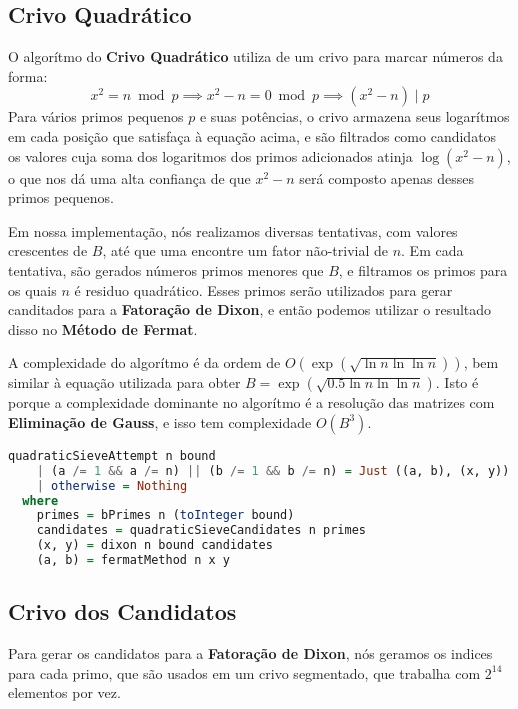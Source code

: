 \documentclass{article}
\newcommand{\divides}{\mid}
\begin{document}
\subsection{Crivo Quadrático}
\label{quadraticSieve}
O algorítmo do \textbf{Crivo Quadrático} utiliza de um crivo para marcar números da forma:
$$ x^2 = n \bmod p \implies x^2 - n = 0 \bmod p \implies (x^2 - n) \divides p $$
Para vários primos pequenos $p$ e suas potências, o crivo armazena seus logarítmos em cada posição que satisfaça à equação acima, e são filtrados como candidatos os valores cuja soma dos logaritmos dos primos adicionados atinja $\log (x^2 - n)$, o que nos dá uma alta confiança de que $x^2 - n$ será composto apenas desses primos pequenos.

Em nossa implementação, nós realizamos diversas tentativas, com valores crescentes de $B$, até que uma encontre um fator não-trivial de $n$. Em cada tentativa, são gerados números primos menores que $B$, e filtramos os primos para os quais $n$ é residuo quadrático. Esses primos serão utilizados para gerar canditados para a \textbf{Fatoração de Dixon}, e então podemos utilizar o resultado disso no \textbf{Método de Fermat}.

A complexidade do algorítmo é da ordem de $O(\exp(\sqrt{\ln n \ln \ln n}))$, bem similar à equação utilizada para obter $B = \exp(\sqrt{0.5 \ln n \ln \ln n})$. Isto é porque a complexidade dominante no algorítmo é a resolução das matrizes com \textbf{Eliminação de Gauss}, e isso tem complexidade $O(B^3)$.

\begin{minipage}{0.9\linewidth}
\begin{lstlisting}[language=haskell,caption=Crivo Quadrático - Principal]
quadraticSieveAttempt n bound
    | (a /= 1 && a /= n) || (b /= 1 && b /= n) = Just ((a, b), (x, y))
    | otherwise = Nothing
  where
    primes = bPrimes n (toInteger bound)
    candidates = quadraticSieveCandidates n primes
    (x, y) = dixon n bound candidates
    (a, b) = fermatMethod n x y
\end{lstlisting}
\end{minipage}

\subsection{Crivo dos Candidatos}
\label{sieve}
Para gerar os candidatos para a \textbf{Fatoração de Dixon}, nós geramos os indices para cada primo, que são usados em um crivo segmentado, que trabalha com $2^{14}$ elementos por vez.
\end{document}
